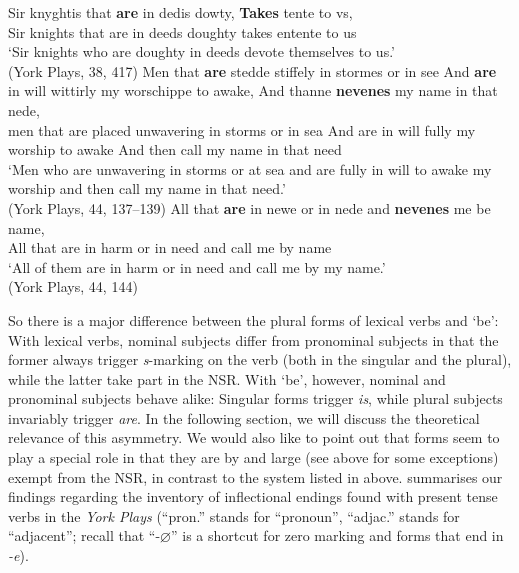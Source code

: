 \documentclass[output=paper]{langsci/langscibook}
\begin{document}
\ea
\label{rule-be}
\ea \gll Sir knyghtis that \textbf{are} in dedis dowty, \textbf{Takes} tente to vs,\\
Sir knights that are in deeds doughty takes entente to us\\
\glt `Sir knights who are doughty in deeds devote themselves to us.'\\
(York Plays, 38, 417)
\ex \gll Men that \textbf{are} stedde stiffely in stormes or in see And \textbf{are} in will wittirly my worschippe to awake, And thanne \textbf{nevenes} my name in that nede, \\
men that are placed unwavering in storms or in sea And are in will fully my worship to awake And then call my name in that need \\
\glt `Men who are unwavering in storms or at sea and are fully in will to awake my worship and then call my name in that need.' \\
(York Plays, 44, 137--139)
\ex \gll All that \textbf{are} in newe or in nede and \textbf{nevenes} me be name,\\
All that are in harm or in need and call me by name\\
\glt `All of them are in harm or in need and call me by my name.'\\
(York Plays, 44, 144)
\z
\z

So there is a major difference between the plural forms of lexical verbs and
`be': With lexical verbs, nominal subjects differ from pronominal subjects in
that the former always trigger \emph{s}-marking on the verb (both in the
singular and the plural), while the latter take part in the \gls{NSR}. With
`be', however, nominal and pronominal subjects behave alike: Singular forms
trigger \emph{is}, while plural subjects invariably trigger \emph{are}. In the
following section, we will discuss the theoretical relevance of this asymmetry.
We would also like to point out that \Fsg{} forms seem to play a special role
in that they are by and large (see above for some exceptions) exempt from the
\gls{NSR}, in contrast to the system listed in  above.
 summarises our findings regarding the inventory of inflectional
endings found with present tense verbs in the \emph{York Plays} (``pron.'' stands
for ``pronoun'', ``adjac.'' stands for ``adjacent''; recall that
``-$\varnothing$'' is a shortcut
for zero marking and forms that end in \emph{-e}).
\end{document}

